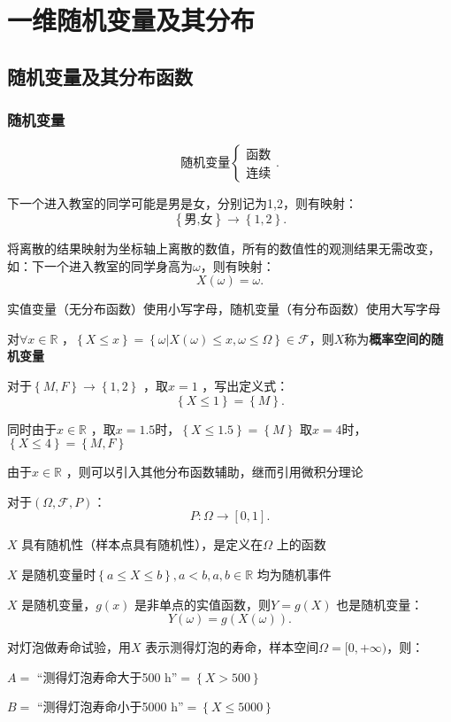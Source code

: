 \section{一维随机变量及其分布}%
\label{sec:一维随机变量及其分布}
\subsection{随机变量及其分布函数}%
\label{sub:随机变量及其分布函数}
\subsubsection*{随机变量}%
\label{subsub:随机变量}
\[
    \mbox{随机变量}
    \begin{cases}
        \mbox{函数}\\ 
        \mbox{连续}
    \end{cases}
.\] 
\begin{eg}
    下一个进入教室的同学可能是男是女，分别记为1,2，则有映射：
    \[
        \left\{ \mbox{男,女} \right\} \to \left\{ 1,2 \right\} 
    .\] 

    将离散的结果映射为坐标轴上离散的数值，所有的数值性的观测结果无需改变，如：下一个进入教室的同学身高为$\omega$，则有映射：
    \[
        X\left( \omega \right) =\omega
    .\] 
\end{eg}
\begin{defi}
    实值变量（无分布函数）使用小写字母，随机变量（有分布函数）使用大写字母

    对$\forall x\in \mathbb{R}$ ，$\left\{ X\le x \right\} =\left\{ \omega|X\left( \omega \right) \le x,\omega\le \Omega \right\}\in \mathscr{F} $，则$X$称为\textbf{概率空间的随机变量}
\end{defi}
\begin{eg}
    对于$\left\{ M,F \right\} \to \left\{ 1,2 \right\} $ ，取$x=1$ ，写出定义式：\[
        \left\{ X\le 1 \right\} =\left\{ M \right\} 
    .\] 

    同时由于$x\in \mathbb{R}$ ，取$x=1.5$时，$\left\{ X\le 1.5 \right\} =\left\{ M \right\} $
    取$x=4$时，$\left\{ X\le 4 \right\} =\left\{ M,F \right\} $
\end{eg}
由于$x\in \mathbb{R}$ ，则可以引入其他分布函数辅助，继而引用微积分理论

对于$\left( \Omega,\mathscr{F},P \right) $：\[
    P: \Omega\to \left[ 0,1 \right] 
.\] 
\begin{notation}
    $X$ 具有随机性（样本点具有随机性），是定义在$\Omega$ 上的函数

    $X$ 是随机变量时$\left\{ a\le X\le b \right\} ,a<b,a,b\in \mathbb{R}$ 均为随机事件

    $X$ 是随机变量，$g\left( x \right) $ 是非单点的实值函数，则$Y=g\left( X \right) $ 也是随机变量：\[
        Y\left( \omega \right) =g\left( X\left( \omega \right)  \right) 
    .\] 
\end{notation}
\begin{eg}
    对灯泡做寿命试验，用$X$ 表示测得灯泡的寿命，样本空间$\Omega=[0,+\infty)$，则：

    $A=$ “测得灯泡寿命大于500 h”$=\left\{ X>500 \right\} $

    $B=$ “测得灯泡寿命小于5000 h”$=\left\{ X\le 5000 \right\} $
\end{eg}
